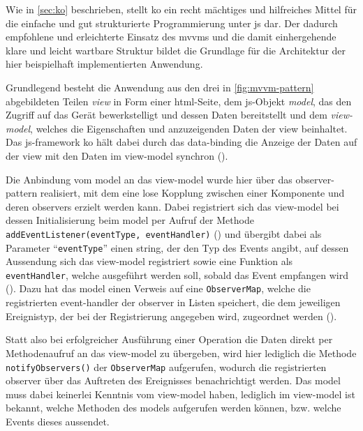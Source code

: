 Wie in \autoref{sec:ko} beschrieben, stellt \gls{ko} ein recht mächtiges und hilfreiches Mittel für die einfache und gut strukturierte Programmierung unter \gls{js} dar.
Der dadurch empfohlene und erleichterte Einsatz des \glspl{mvvm} und die damit einhergehende klare und leicht wartbare Struktur bildet die Grundlage für die Architektur der hier beispielhaft implementierten Anwendung.
	
Grundlegend besteht die Anwendung aus den drei in \autoref{fig:mvvm-pattern} abgebildeten Teilen \emph{\gls{view}} in Form einer \gls{html}-Seite, dem \gls{js}-Objekt \emph{\gls{model}}, das den Zugriff auf das Gerät bewerkstelligt und dessen Daten bereitstellt und dem \emph{\gls{view-model}}, welches die Eigenschaften und anzuzeigenden Daten der \gls{view} beinhaltet.
Das \gls{js}-\gls{framework} \gls{ko} hält dabei durch das \gls{data-binding} die Anzeige der Daten auf der \gls{view} mit den Daten im \gls{view-model} synchron ().

Die Anbindung vom \gls{model} an das \gls{view-model} wurde hier über das \gls{observer-pattern} realisiert, mit dem eine lose Kopplung zwischen einer Komponente und deren \glspl{observer} erzielt werden kann.
Dabei registriert sich das \gls{view-model} bei dessen Initialisierung beim \gls{model} per Aufruf der Methode \lstinline|addEventListener(eventType, eventHandler)| () und übergibt dabei als Parameter \enquote{\lstinline|eventType|} einen \gls{string}, der den Typ des Events angibt, auf dessen Aussendung sich das \gls{view-model} registriert sowie eine Funktion als \lstinline|eventHandler|, welche ausgeführt werden soll, sobald das Event empfangen wird ().
Dazu hat das \gls{model} einen Verweis auf eine \lstinline|ObserverMap|, welche die registrierten \gls{event-handler} der \gls{observer} in Listen speichert, die dem jeweiligen Ereignistyp, der bei der Registrierung angegeben wird, zugeordnet werden ().

Statt also bei erfolgreicher Ausführung einer Operation die Daten direkt per Methodenaufruf an das \gls{view-model} zu übergeben, wird hier lediglich die Methode \lstinline|notifyObservers()| der \lstinline|ObserverMap| aufgerufen, wodurch die registrierten \gls{observer} über das Auftreten des Ereignisses benachrichtigt werden.
Das \gls{model} muss dabei keinerlei Kenntnis vom \gls{view-model} haben, lediglich im \gls{view-model} ist bekannt, welche Methoden des \glspl{model} aufgerufen werden können, bzw. welche Events dieses aussendet.

